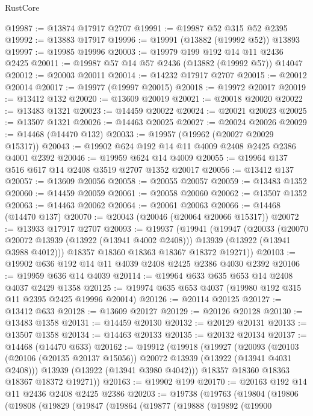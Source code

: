 \begin{lexlean}{RustCore}
\begin{coremodule}
@19987 := @13874 @17917 @2707
@19991 := @19987 @52 @315 @52 @2395
@19992 := @13883 @17917
@19996 := @19991 (@13882 (@19992 @52)) @13893
@19997 := @19985 @19996
@20003 := @19979 @199 @192 @14 @11 @2436 @2425
@20011 := @19987 @57 @14 @57 @2436 (@13882 (@19992 @57)) @14047
@20012 := @20003 @20011
@20014 := @14232 @17917 @2707
@20015 := @20012 @20014
@20017 := @19977 (@19997 @20015)
@20018 := @19972 @20017
@20019 := @13412 @132
@20020 := @13609 @20019
@20021 := @20018 @20020
@20022 := @13483 @1321
@20023 := @14459 @20022
@20024 := @20021 @20023
@20025 := @13507 @1321
@20026 := @14463 @20025
@20027 := @20024 @20026
@20029 := @14468 (@14470 @132)
@20033 := @19957 (@19962 (@20027 @20029 @15317))
@20043 := @19902 @624 @192 @14 @11 @4009 @2408 @2425 @2386 @4001 @2392
@20046 := @19959 @624 @14 @4009
@20055 := @19964 @137 @516 @617 @14 @2408 @3519 @2707 @1352 @20017
@20056 := @13412 @137
@20057 := @13609 @20056
@20058 := @20055 @20057
@20059 := @13483 @1352
@20060 := @14459 @20059
@20061 := @20058 @20060
@20062 := @13507 @1352
@20063 := @14463 @20062
@20064 := @20061 @20063
@20066 := @14468 (@14470 @137)
@20070 := @20043 (@20046 (@20064 @20066 @15317))
@20072 := @13933 @17917 @2707
@20093 := @19937
    (@19941
      (@19947
        (@20033
          (@20070 @20072 @13939 (@13922 (@13941 @4002 @2408)))
          @13939
          (@13922 (@13941 @3988 @4012)))
        @18357
        @18360
        @18363
        @18367
        @18372
        @19271))
@20103 := @19902 @636 @192 @14 @11 @4039 @2408 @2425 @2386 @4030 @2392
@20106 := @19959 @636 @14 @4039
@20114 := @19964 @633 @635 @653 @14 @2408 @4037 @2429 @1358
@20125 := @19974 @635 @653 @4037 (@19980 @192 @315 @11 @2395 @2425 @19996 @20014)
@20126 := @20114 @20125
@20127 := @13412 @633
@20128 := @13609 @20127
@20129 := @20126 @20128
@20130 := @13483 @1358
@20131 := @14459 @20130
@20132 := @20129 @20131
@20133 := @13507 @1358
@20134 := @14463 @20133
@20135 := @20132 @20134
@20137 := @14468 (@14470 @633)
@20162 := @19912
    (@19918
      (@19927
        (@20093
          (@20103 (@20106 (@20135 @20137 @15056)) @20072 @13939 (@13922 (@13941 @4031 @2408)))
          @13939
          (@13922 (@13941 @3980 @4042)))
        @18357
        @18360
        @18363
        @18367
        @18372
        @19271))
@20163 := @19902 @199
@20170 := @20163 @192 @14 @11 @2436 @2408 @2425 @2386
@20203 := @19738
    (@19763
      (@19804
        (@19806
          (@19808
            (@19829
              (@19847
                (@19864
                  (@19877
                    (@19888
                      (@19892
                        (@19900

\end{coremodule}
\end{lexlean}
